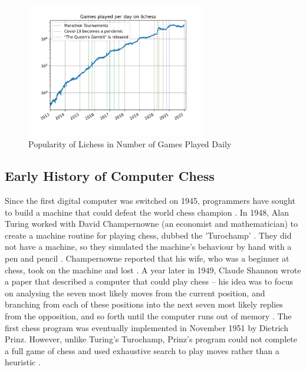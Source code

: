 \documentclass[%
 superscriptaddress,
showpacs,preprintnumbers,
 amsmath,
 amssymb,
 aps,
 pra,
showkeys,
onecolumn,
notitlepage,
11pt,
tightenlines      %
]{revtex4-1}
\begin{document}
\begin{figure}[H]
    \caption{Popularity of Lichess in Number of Games Played Daily \cite{chessOpeningStats}}
    \begin{center}
    \includegraphics[width=0.7\textwidth]{images/Lichess Number of Games Played Per Day.png}
    \end{center}
\end{figure}

\subsection{Early History of Computer Chess}
Since the first digital computer was switched on 1945, programmers have sought to build a machine that could defeat the world chess champion \cite{earlyComputerChessHistory}. In 1948, Alan Turing worked with David Champernowne (an economist and mathematician) to create a machine routine for playing chess, dubbed the 'Turochamp' \cite{turingalan}. They did not have a machine, so they simulated the machine's behaviour by hand with a pen and pencil \cite{turingalan}. Champernowne reported that his wife, who was a beginner at chess, took on the machine and lost \cite{copeland2005turing}. A year later in 1949, Claude Shannon wrote a paper that described a computer that could play chess -- his idea was to focus on analysing the seven most likely moves from the current position, and branching from each of these positions into the next seven most likely replies from the opposition, and so forth until the computer runs out of memory \cite{shannon1950xxii}. The first chess program was eventually implemented in November 1951 by Dietrich Prinz. However, unlike Turing's Turochamp, Prinz's program could not complete a full game of chess and used exhaustive search to play moves rather than a heuristic \cite{copeland2005turing}.
\end{document}
